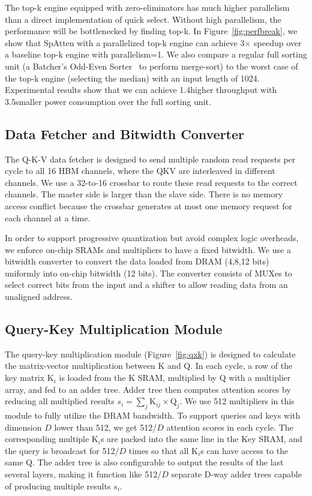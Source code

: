 The top-k engine equipped with zero-eliminators has much higher parallelism than a direct implementation of quick select. Without high parallelism, the performance will be bottlenecked by finding top-k. In Figure~\ref{fig:perfbreak}, we show that SpAtten with a parallelized top-k engine can achieve 3$\times$ speedup over a baseline top-k engine with parallelism=1. We also compare a regular full sorting unit (a Batcher's Odd-Even Sorter~\cite{10.5555/280635} to perform merge-sort) to the worst case of the top-k engine (selecting the median) with an input length of 1024. Experimental results show that we can achieve 1.4\x higher throughput with 3.5\x smaller power consumption over the full sorting unit.




\subsection{Data Fetcher and Bitwidth Converter}
The Q-K-V data fetcher is designed to send multiple random read requests per cycle to all 16 HBM channels, where the QKV are interleaved in different channels. We use a 32-to-16 crossbar to route these read requests to the correct channels. The master side is larger than the slave side. There is no memory access conflict because the crossbar generates at most one memory request for each channel at a time.

In order to support progressive quantization but avoid complex logic overheads, we enforce on-chip SRAMs and multipliers to have a fixed bitwidth. We use a bitwidth converter to convert the data loaded from DRAM (4,8,12 bits) uniformly into on-chip bitwidth (12 bits). The converter consists of MUXes to select correct bits from the input and a shifter to allow reading data from an unaligned address.


\subsection{Query-Key Multiplication Module}
The query-key multiplication module (Figure~\ref{fig:qxk}) is designed to calculate the matrix-vector multiplication between K and Q. In each cycle, a row of the key matrix K$_i$ is loaded from the K SRAM, multiplied by Q with a multiplier array, and fed to an adder tree. Adder tree then computes attention scores by reducing all multiplied results $s_i = \sum_j \mathrm{K}_{ij} \times \mathrm{Q}_j$.
We use 512 multipliers in this module to fully utilize the DRAM bandwidth. To support queries and keys with dimension $D$ lower than 512, we get 512/$D$ attention scores in each cycle. The corresponding multiple K$_i$s are packed into the same line in the Key SRAM, and the query is broadcast for 512/$D$ times so that all K$_i$s can have access to the same Q. The adder tree is also configurable to output the results of the last several layers, making it function like 512/$D$ separate D-way adder trees capable of producing multiple results $s_i$.


